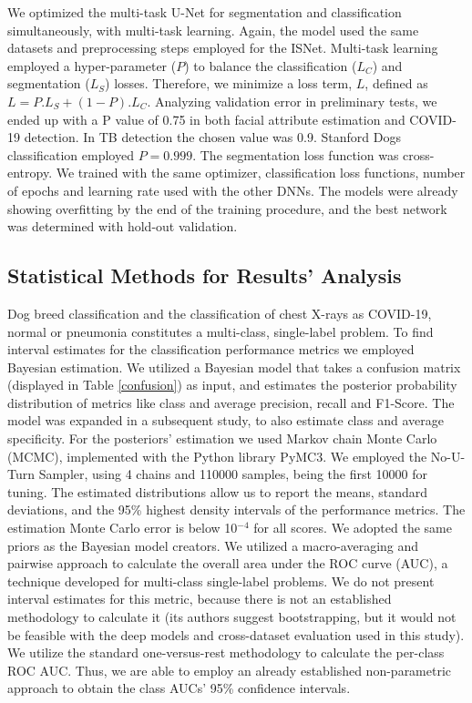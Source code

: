 \documentclass[fleqn,10pt]{wlscirep}
\begin{document}
{We optimized the multi-task U-Net for segmentation and classification simultaneously, with multi-task learning. Again, the model used the same datasets and preprocessing steps employed for the ISNet. Multi-task learning employed a hyper-parameter ($P$) to balance the classification ($L_{C}$) and segmentation ($L_{S}$) losses. Therefore, we minimize a loss term, $L$, defined as  $L=P.L_{S}+(1-P).L_{C}$. Analyzing validation error in preliminary tests, we ended up with a P value of 0.75 in both facial attribute estimation and COVID-19 detection. In TB detection the chosen value was 0.9. Stanford Dogs classification employed $P=0.999$. The segmentation loss function was cross-entropy. We trained with the same optimizer, classification loss functions, number of epochs and learning rate used with the other DNNs. The models were already showing overfitting by the end of the training procedure, and the best network was determined with hold-out validation.

\subsection{Statistical Methods for Results' Analysis}
\label{statisticalMethods}
Dog breed classification and the classification of chest X-rays as COVID-19, normal or pneumonia constitutes a multi-class, single-label problem. To find interval estimates for the classification performance metrics we employed Bayesian estimation. We utilized a Bayesian model\cite{bayesianEstimator} that takes a confusion matrix (displayed in Table \ref{confusion}) as input, and estimates the posterior probability distribution of metrics like class and average precision, recall and F1-Score. The model was expanded in a subsequent study\cite{bassi2021covid19}, to also estimate class and average specificity. For the posteriors' estimation we used Markov chain Monte Carlo (MCMC), implemented with the Python library PyMC3\cite{pymc}. We employed the No-U-Turn Sampler\cite{NUTS}, using 4 chains and 110000 samples, being the first 10000 for tuning. The estimated distributions allow us to report the means, standard deviations, and the 95\% highest density intervals of the performance metrics. The estimation Monte Carlo error is below 10$^{-4}$ for all scores. We adopted the same priors as the Bayesian model creators\cite{bayesianEstimator}. We utilized a macro-averaging and pairwise approach to calculate the overall area under the ROC curve (AUC), a technique developed for multi-class single-label problems\cite{MulticlassAUC}. We do not present interval estimates for this metric, because there is not an established methodology to calculate it (its authors\cite{MulticlassAUC} suggest bootstrapping, but it would not be feasible with the deep models and cross-dataset evaluation used in this study). We utilize the standard one-versus-rest methodology to calculate the per-class ROC AUC. Thus, we are able to employ an already established non-parametric approach\cite{DeLongAUC} to obtain the class AUCs' 95\% confidence intervals.

}
\end{document}

